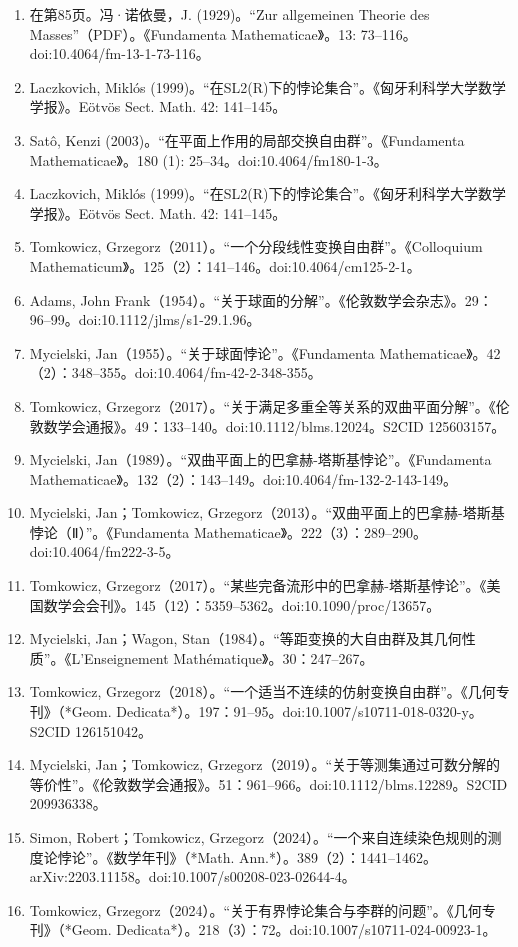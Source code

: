 \begin{enumerate}
\item 在第85页。冯·诺依曼，J. (1929)。“Zur allgemeinen Theorie des Masses”（PDF）。《Fundamenta Mathematicae》。13: 73–116。doi:10.4064/fm-13-1-73-116。
\item Laczkovich, Miklós (1999)。“在SL2(R)下的悖论集合”。《匈牙利科学大学数学学报》。Eötvös Sect. Math. 42: 141–145。
\item Satô, Kenzi (2003)。“在平面上作用的局部交换自由群”。《Fundamenta Mathematicae》。180 (1): 25–34。doi:10.4064/fm180-1-3。
\item Laczkovich, Miklós (1999)。“在SL2(R)下的悖论集合”。《匈牙利科学大学数学学报》。Eötvös Sect. Math. 42: 141–145。
\item Tomkowicz, Grzegorz（2011）。“一个分段线性变换自由群”。《Colloquium Mathematicum》。125（2）：141–146。doi:10.4064/cm125-2-1。  
\item Adams, John Frank（1954）。“关于球面的分解”。《伦敦数学会杂志》。29：96–99。doi:10.1112/jlms/s1-29.1.96。  
\item Mycielski, Jan（1955）。“关于球面悖论”。《Fundamenta Mathematicae》。42（2）：348–355。doi:10.4064/fm-42-2-348-355。  
\item Tomkowicz, Grzegorz（2017）。“关于满足多重全等关系的双曲平面分解”。《伦敦数学会通报》。49：133–140。doi:10.1112/blms.12024。S2CID 125603157。
\item Mycielski, Jan（1989）。“双曲平面上的巴拿赫-塔斯基悖论”。《Fundamenta Mathematicae》。132（2）：143–149。doi:10.4064/fm-132-2-143-149。  
\item Mycielski, Jan；Tomkowicz, Grzegorz（2013）。“双曲平面上的巴拿赫-塔斯基悖论（Ⅱ）”。《Fundamenta Mathematicae》。222（3）：289–290。doi:10.4064/fm222-3-5。  
\item Tomkowicz, Grzegorz（2017）。“某些完备流形中的巴拿赫-塔斯基悖论”。《美国数学会会刊》。145（12）：5359–5362。doi:10.1090/proc/13657。  
\item Mycielski, Jan；Wagon, Stan（1984）。“等距变换的大自由群及其几何性质”。《L’Enseignement Mathématique》。30：247–267。
\item Tomkowicz, Grzegorz（2018）。“一个适当不连续的仿射变换自由群”。《几何专刊》（*Geom. Dedicata*）。197：91–95。doi:10.1007/s10711-018-0320-y。S2CID 126151042。  
\item Mycielski, Jan；Tomkowicz, Grzegorz（2019）。“关于等测集通过可数分解的等价性”。《伦敦数学会通报》。51：961–966。doi:10.1112/blms.12289。S2CID 209936338。  
\item Simon, Robert；Tomkowicz, Grzegorz（2024）。“一个来自连续染色规则的测度论悖论”。《数学年刊》（*Math. Ann.*）。389（2）：1441–1462。arXiv:2203.11158。doi:10.1007/s00208-023-02644-4。  
\item Tomkowicz, Grzegorz（2024）。“关于有界悖论集合与李群的问题”。《几何专刊》（*Geom. Dedicata*）。218（3）：72。doi:10.1007/s10711-024-00923-1。
\end{enumerate}

